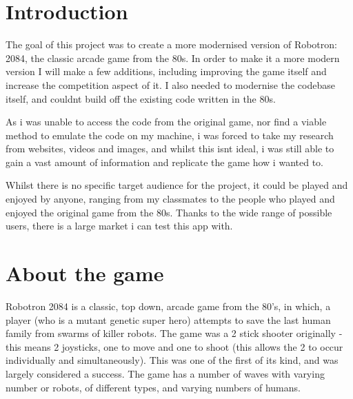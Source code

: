 \section{Introduction}
The goal of this project was to create a more modernised version of Robotron: 2084, the classic arcade game from the 80s. In order to make it a more modern version I will make a few additions, including improving the game itself and increase the competition aspect of it. I also needed to modernise the codebase itself, and couldnt build off the existing code written in the 80s.

As i was unable to access the code from the original game, nor find a viable method to emulate the code on my machine, i was forced to take my research from websites, videos and images, and whilst this isnt ideal, i was still able to gain a vast amount of information and replicate the game how i wanted to.

Whilst there is no specific target audience for the project, it could be played and enjoyed by anyone, ranging from my classmates to the people who played and enjoyed the original game from the 80s. Thanks to the wide range of possible users, there is a large market i can test this app with.

\section{About the game}

Robotron 2084 is a classic, top down, arcade game from the 80's, in which, a player (who is a mutant genetic super hero) attempts to save the last human family from swarms of killer robots. The game was a 2 stick shooter originally - this means 2 joysticks, one to move and one to shoot (this allows the 2 to occur individually and simultaneously). This was one of the first of its kind, and was largely considered a success. The game has a number of waves with varying number or robots, of different types, and varying numbers of humans.

